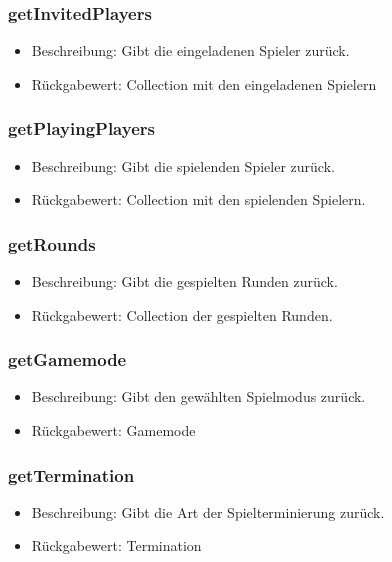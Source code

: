 \documentclass[a4paper]{scrreprt}
\begin{document}
	\subsubsection{getInvitedPlayers}
	\begin{itemize}
		\item Beschreibung: Gibt die eingeladenen Spieler zurück.
		\item Rückgabewert: Collection mit den eingeladenen Spielern
	\end{itemize}
	
	\subsubsection{getPlayingPlayers}
	\begin{itemize}
		\item Beschreibung: Gibt die spielenden Spieler zurück.
		\item Rückgabewert: Collection mit den spielenden Spielern.
	\end{itemize}
	
	\subsubsection{getRounds}
	\begin{itemize}
		\item Beschreibung: Gibt die gespielten Runden zurück.
		\item Rückgabewert: Collection der gespielten Runden.
	\end{itemize}
	
	\subsubsection{getGamemode}
	\begin{itemize}
		\item Beschreibung: Gibt den gewählten Spielmodus zurück.
		\item Rückgabewert: Gamemode
	\end{itemize}
	
	\subsubsection{getTermination}
	\begin{itemize}
		\item Beschreibung: Gibt die Art der Spielterminierung zurück.
		\item Rückgabewert: Termination
	\end{itemize}
	
\end{document}
